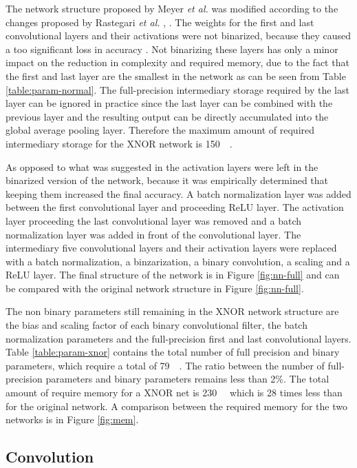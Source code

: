 \documentclass[conference]{IEEEtran}
\begin{document}
The network structure proposed by Meyer \textit{et al.} was modified according to the changes proposed by Rastegari \textit{et al.} \cite{xnor}, \cite{lukas}. The weights for the first and last convolutional layers and their activations were not binarized, because they caused a too significant loss in accuracy \cite{xnor}. Not binarizing these layers has only a minor impact on the reduction in complexity and required memory, due to the fact that the first and last layer are the smallest in the network as can be seen from Table \ref{table:param-normal}. The full-precision intermediary storage required by the last layer can be ignored in practice since the last layer can be combined with the previous layer and the resulting output can be directly accumulated into the global average pooling layer. Therefore the maximum amount of required intermediary storage for the XNOR network is \SI{150}{\kilo\byte}.

As opposed to what was suggested in \cite{xnor} the activation layers were left in the binarized version of the network, because it was empirically determined that keeping them increased the final accuracy. A batch normalization layer was added between the first convolutional layer and proceeding ReLU layer. The activation layer proceeding the last convolutional layer was removed and a batch normalization layer was added in front of the convolutional layer. The intermediary five convolutional layers and their activation layers were replaced with a batch normalization, a binzarization, a binary convolution, a scaling and a ReLU layer. The final structure of the network is in Figure \ref{fig:nn-full} and can be compared with the original network structure in Figure \ref{fig:nn-full}.

The non binary parameters still remaining in the XNOR network structure are the bias and scaling factor of each binary convolutional filter, the batch normalization parameters and the full-precision first and last convolutional layers. Table \ref{table:param-xnor} contains the total number of full precision and binary parameters, which require a total of \SI{79}{\kilo\byte}. The ratio between the number of full-precision parameters and binary parameters remains less than 2\%. The total amount of require memory for a XNOR net is \SI{230}{\kilo\byte} which is 28 times less than for the original network. A comparison between the required memory for the two networks is in Figure \ref{fig:mem}.

\subsection{Convolution}
\end{document}
